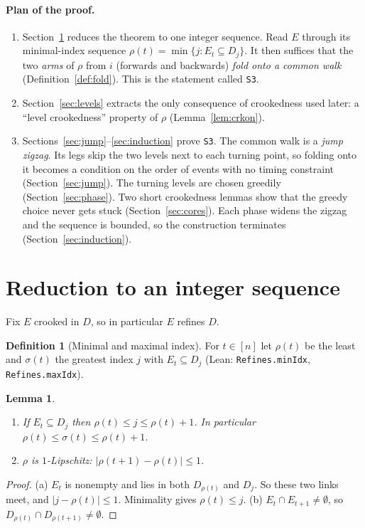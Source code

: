 \documentclass[11pt]{article}
\newtheorem{lemma}[theorem]{Lemma}
\theoremstyle{definition}
\newtheorem{definition}[theorem]{Definition}
\theoremstyle{remark}
\newcommand{\lean}[1]{\texttt{#1}}
\begin{document}
\paragraph{Plan of the proof.}
\begin{enumerate}
\item Section~\ref{sec:reduction} reduces the theorem to one integer sequence.
Read $E$ through its minimal-index sequence
$\rho(t)=\min\{j: E_t\subseteq D_j\}$. It then suffices that the two
\emph{arms} of $\rho$ from $i$ (forwards and backwards) \emph{fold onto a common
walk} (Definition~\ref{def:fold}). This is the statement called \lean{S3}.
\item Section~\ref{sec:levels} extracts the only consequence of crookedness
used later: a ``level crookedness'' property of $\rho$
(Lemma~\ref{lem:crkon}).
\item Sections~\ref{sec:jump}--\ref{sec:induction} prove \lean{S3}. The
common walk is a \emph{jump zigzag}. Its legs skip the two levels next to each
turning point, so folding onto it becomes a condition on the order of events
with no timing constraint (Section~\ref{sec:jump}). The turning levels are
chosen greedily (Section~\ref{sec:phase}). Two short crookedness lemmas show
that the greedy choice never gets stuck (Section~\ref{sec:cores}). Each phase
widens the zigzag and the sequence is bounded, so the construction terminates
(Section~\ref{sec:induction}).
\end{enumerate}

\section{Reduction to an integer sequence}\label{sec:reduction}

Fix $E$ crooked in $D$, so in particular $E$ refines $D$.

\begin{definition}[Minimal and maximal index]
For $t\in[n]$ let $\rho(t)$ be the least and $\sigma(t)$ the greatest index $j$
with $E_t\subseteq D_j$ (Lean: \lean{Refines.minIdx}, \lean{Refines.maxIdx}).
\end{definition}

\begin{lemma}\label{lem:rho-basic}
\begin{enumerate}[label=(\alph*)]
\item If $E_t\subseteq D_j$ then $\rho(t)\le j\le\rho(t)+1$. In particular
$\rho(t)\le\sigma(t)\le\rho(t)+1$.
\item $\rho$ is $1$-Lipschitz: $|\rho(t+1)-\rho(t)|\le1$.
\end{enumerate}
\end{lemma}
\begin{proof}
(a) $E_t$ is nonempty and lies in both $D_{\rho(t)}$ and $D_j$. So these two
links meet, and $|j-\rho(t)|\le1$. Minimality gives $\rho(t)\le j$.
(b) $E_t\cap E_{t+1}\ne\emptyset$, so $D_{\rho(t)}\cap D_{\rho(t+1)}\ne\emptyset$.
\end{proof}
\end{document}
